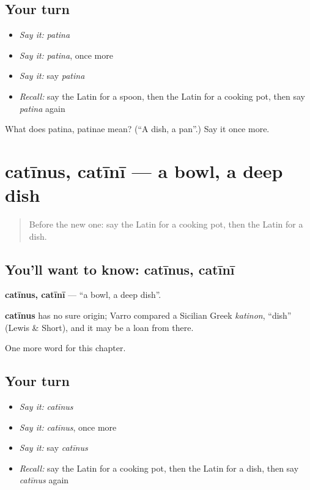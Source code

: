 \subsection*{Your turn}
\begin{itemize}
\raggedright
  \item \emph{Say it:} \emph{patina}
  \item \emph{Say it:} \emph{patina}, once more
  \item \emph{Say it:} say \emph{patina}
  \item \emph{Recall:} say the Latin for a spoon, then the Latin for a cooking pot, then say \emph{patina} again
\end{itemize}

\begin{tcolorbox}[breakable,colback=teal!4,colframe=teal!35!black,title={Before you move on}]
What does patina, patinae mean? (\textquotedblleft{}A dish, a pan\textquotedblright{}.) Say it once more.
\end{tcolorbox}
\section[catīnus, catīnī]{catīnus, catīnī — a bowl, a deep dish}

\label{lesson:LA-C121-catinus}



\begin{quote}
Before the new one: say the Latin for a cooking pot, then the Latin for a dish.
\end{quote}

\subsection*{You'll want to know: catīnus, catīnī}
\textbf{catīnus, catīnī} — \textquotedblleft{}a bowl, a deep dish\textquotedblright{}.

\begin{cousinweb}
\textbf{catīnus} has no sure origin; Varro compared a Sicilian Greek \emph{katinon}, \textquotedblleft{}dish\textquotedblright{} (Lewis \& Short), and it may be a loan from there.
\end{cousinweb}

\begin{grammarlens}[title={What you've built}]
One more word for this chapter.
\end{grammarlens}

\subsection*{Your turn}
\begin{itemize}
\raggedright
  \item \emph{Say it:} \emph{catīnus}
  \item \emph{Say it:} \emph{catīnus}, once more
  \item \emph{Say it:} say \emph{catīnus}
  \item \emph{Recall:} say the Latin for a cooking pot, then the Latin for a dish, then say \emph{catīnus} again
\end{itemize}

